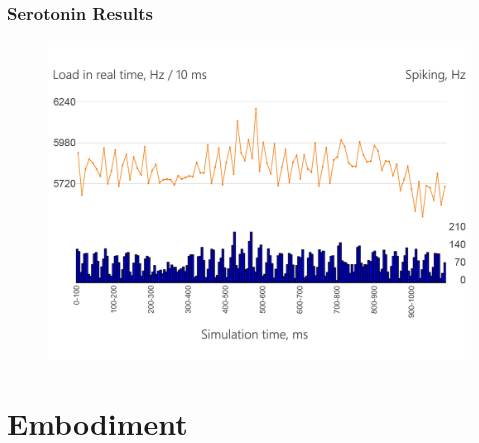 \documentclass[12pt, aspectratio=169]{beamer}
\begin{document}

\begin{frame}
\frametitle{Serotonin Results}
\begin{figure}
\includegraphics[width=0.8\linewidth]{5ht_results}
\end{figure}
\end{frame}

\section{Embodiment}
\end{document}
